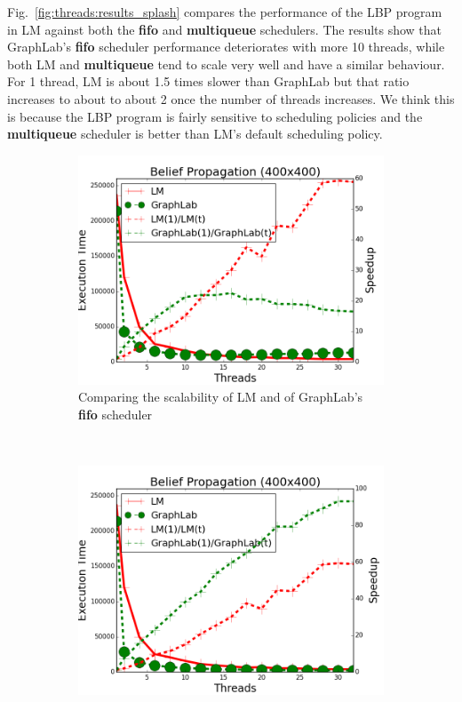 Fig.~\ref{fig:threads:results_splash} compares the performance of the LBP
program in LM against both the \textbf{fifo} and \textbf{multiqueue} schedulers.
The results show that GraphLab's \textbf{fifo} scheduler performance
deteriorates with more 10 threads, while both LM and \textbf{multiqueue} tend to
scale very well and have a similar behaviour. For 1 thread, LM is about 1.5
times slower than GraphLab but that ratio increases to about to about 2 once the
number of threads increases. We think this is because the LBP program is fairly
sensitive to scheduling policies and the \textbf{multiqueue} scheduler is
better than LM's default scheduling policy.

\begin{figure}[]
        \centering
        \begin{subfigure}[b]{\plotsize\textwidth}
           \includegraphics[width=\textwidth]{experiments/threads/cmp-fifo-belief-propagation-400.png}
           \caption{Comparing the scalability of LM and of GraphLab's
              \textbf{fifo} scheduler}
           \label{fig:threads:splash_fifo}
        \end{subfigure}
        ~
        \begin{subfigure}[b]{\plotsize\textwidth}
           \includegraphics[width=\textwidth]{experiments/threads/cmp-multi-belief-propagation-400.png}

\end{subfigure}
\end{figure}

